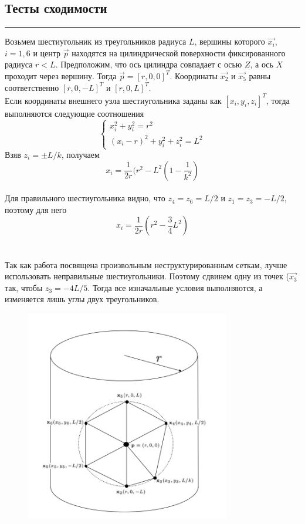 \documentclass[12pt,a4paper, titlepage]{article}
\begin{document}
\subsection*{Тесты сходимости}
\noindent\rule{\textwidth}{1pt}
Возьмем шестиугольник из треугольников радиуса $L$, вершины которого $\vec{x_i}$, $i = 1, 6$ и центр $\vec{p}$ находятся на цилиндрической поверхности фиксированного радиуса $r < L$. Предположим, что ось цилиндра совпадает с осью $Z$, а ось $X$ проходит через вершину. Тогда $\vec{p} = [r, 0, 0]^T$. Координаты $\vec{x_2}$ и $\vec{x_5}$ равны соответственно $[r, 0, -L]^T$ и $[r, 0, L]^T$.
\\
Если координаты внешнего узла шестиугольника заданы как $[x_i, y_i, z_i]^T$, тогда выполняются следующие соотношения
\begin{equation}
\begin{cases}
x_i^2 + y_i^2 = r^2
\\
(x_i - r)^2 + y_i^2 + z_i^2 = L^2
\end{cases}
\end{equation}
Взяв $z_i = \pm L/k$, получаем
\begin{equation}
x_i = \frac{1}{2r}(r^2 - L^2(1 - \frac{1}{k^2})
\end{equation}
\\
Для правильного шестиугольника видно, что $z_4 = z_6 = L/2$ и $z_1 = z_3 = -L/2$, поэтому для него
\begin{equation}
x_i = \frac{1}{2r}(r^2 - \frac{3}{4}L^2)
\end{equation}
\\
\\
Так как работа посвящена произвольным неструктурированным сеткам, лучше использовать неправильные шестиугольники. Поэтому сдвинем одну из точек ($\vec{x_3}$ так, чтобы $z_3 = -4L/5$. Тогда все изначальные условия выполняются, а изменяется лишь углы двух треугольников.
\begin{figure}[H]
	\centering
	\includegraphics[width = 0.8\textwidth]{2.png}
\end{figure}
\end{document}
